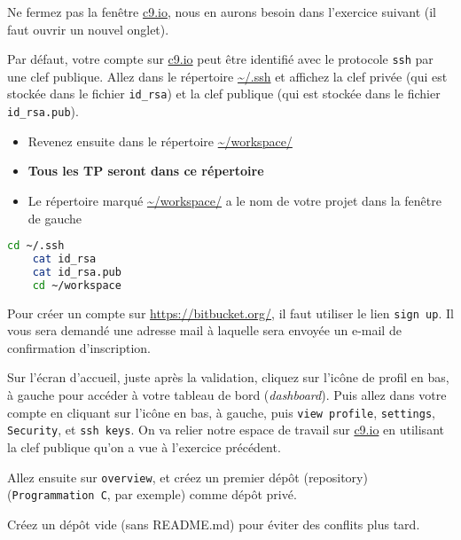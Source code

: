 \begin{fminipage}{0.9\textwidth}
  Ne fermez pas la fenêtre \url{c9.io}, nous en aurons besoin dans
  l'exercice suivant (il faut ouvrir un nouvel onglet).
\end{fminipage}

\question Par défaut, votre compte sur \url{c9.io} peut être identifié
avec le protocole \texttt{ssh} par une clef publique. Allez dans le répertoire \url{~/.ssh} et affichez la clef privée (qui est stockée dans le fichier \texttt{id\_rsa}) et la clef publique (qui est stockée dans le fichier \texttt{id\_rsa.pub}).

\begin{fminipage}{\textwidth}
  \begin{itemize}
  \item Revenez ensuite dans le répertoire \url{~/workspace/}
  \item \textbf{Tous les TP seront dans ce répertoire}
  \item Le répertoire marqué \url{~/workspace/} a le nom de votre projet dans la
    fenêtre de gauche
  \end{itemize}
\end{fminipage}


\begin{solution}
  \begin{lstlisting}[language=bash]
    cd ~/.ssh
    cat id_rsa
    cat id_rsa.pub
    cd ~/workspace
  \end{lstlisting}
\end{solution}


Pour créer un compte sur \url{https://bitbucket.org/}, il faut
utiliser le lien \texttt{sign up}. Il vous sera demandé une adresse
mail à laquelle sera envoyée un e-mail de confirmation d'inscription.


\question Sur l'écran d'accueil, juste après la validation, cliquez
sur l'icône de profil en bas, à gauche pour accéder à votre tableau de
bord (\emph{dashboard}). Puis allez dans votre compte en cliquant sur
l'icône en bas, à gauche, puis \texttt{view profile},
\texttt{settings}, \texttt{Security}, et \texttt{ssh keys}. On va
relier notre espace de travail sur \url{c9.io} en utilisant la clef
publique qu'on a vue à l'exercice précédent.

\question Allez ensuite sur \texttt{overview}, et créez un premier
dépôt (repository) (\texttt{Programmation C}, par exemple) comme dépôt
privé. 
\begin{fminipage}{\textwidth}
  Créez un dépôt vide (sans README.md) pour éviter des conflits plus
  tard.
\end{fminipage}



